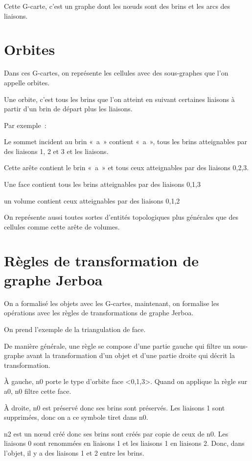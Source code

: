 \documentclass[11pt]{article}
\begin{document}
Cette G-carte, c'est un graphe dont les nœuds sont des brins et les arcs des
liaisons.

\section{Orbites}
\label{sec:org99b57a4}

Dans ces G-cartes, on représente les cellules avec des sous-graphes que l'on
appelle orbites.

Une orbite, c'est tous les brins que l'on atteint en suivant certaines liaisons
à partir d'un brin de départ plus les liaisons.

Par exemple~:

Le sommet incident au brin «~a~» contient «~a~», tous les brins atteignables par des
liaisons 1, 2 et 3 et les liaisons.

Cette arête contient le brin «~a~» et tous ceux atteignables par des liaisons 0,2,3.

Une face contient tous les brins atteignables par des liaisons 0,1,3

un volume contient ceux atteignables par des liaisons 0,1,2

On représente aussi toutes sortes d'entités topologiques plus générales que des
cellules comme cette arête de volumes.

\section{Règles de transformation de graphe Jerboa}
\label{sec:org89fe9a5}

On a formalisé les objets avec les G-cartes, maintenant, on formalise les
opérations avec les règles de transformations de graphe Jerboa.

On prend l'exemple de la triangulation de face.

De manière générale, une règle se compose d'une partie gauche qui filtre un
sous-graphe avant la transformation d'un objet et d'une partie droite qui décrit
la transformation.

À gauche, n0 porte le type d'orbite face <0,1,3>. Quand on applique la règle sur
a0, n0 filtre cette face.

À droite, n0 est préservé donc ses brins sont préservés. Les liaisons 1 sont
supprimées, donc on a ce symbole tiret dans n0.

n2 est un nœud créé donc ses brins sont créés par copie de ceux de n0. %
Les liaisons 0 sont renommées en liaisons 1 et les liaisons 1 en liaisons 2. %
Donc, dans l'objet, il y a des liaisons 1 et 2 entre les brins.
\end{document}
